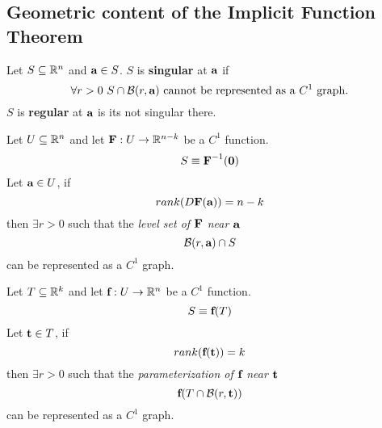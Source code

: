 \documentclass[11pt]{article}
\begin{document}
		\subsection{Geometric content of the Implicit Function Theorem}
			\begin{definition}
				Let $S \subseteq \mathbb{R}^n$ and $\textbf{a} \in S$. $S$ is \textbf{singular} at $\textbf{a}$ if 
				\begin{equation}
					\forall r > 0\ S \cap \mathcal{{B}}(r, \textbf{a}) \text{{ cannot be represented as a $C^1$ graph.}}
				\end{equation}
				$S$ is \textbf{regular} at $\textbf{a}$ is its not singular there.
			\end{definition}
			
			\begin{theorem}
				Let $U \subseteq \mathbb{R}^n$ and let $\textbf{F}: U \to \mathbb{R}^{n-k}$ be a $C^1$ function.
				\begin{equation}
					S \equiv \textbf{F}^{-1}(\textbf{0})
				\end{equation}
				Let $\textbf{a} \in U$, if 
				\begin{equation}
					rank(D\textbf{F}(\textbf{a})) = n - k
				\end{equation}
				then $\exists r > 0$ such that the \emph{level set of $\textbf{F}$ near $\textbf{a}$}
				\begin{equation}
					\mathcal{{B}}(r, \textbf{a}) \cap S
				\end{equation}
				can be represented as a $C^1$ graph.
			\end{theorem}
			
			\begin{theorem}
				Let $T \subseteq \mathbb{R}^k$ and let $\textbf{f}: U \to \mathbb{R}^n$ be a $C^1$ function.
				\begin{equation}
					S \equiv \textbf{f}(T)
				\end{equation}
				Let $\textbf{t} \in T$, if
				\begin{equation}
					rank(\textbf{f}(\textbf{t})) = k
				\end{equation}
				then $\exists r > 0$ such that the \emph{parameterization of $\textbf{f}$ near $\textbf{t}$}
				\begin{equation}
					\textbf{f}(T \cap \mathcal{{B}}(r, \textbf{t}))
				\end{equation}
				can be represented as a $C^1$ graph.
			\end{theorem}
\end{document}

